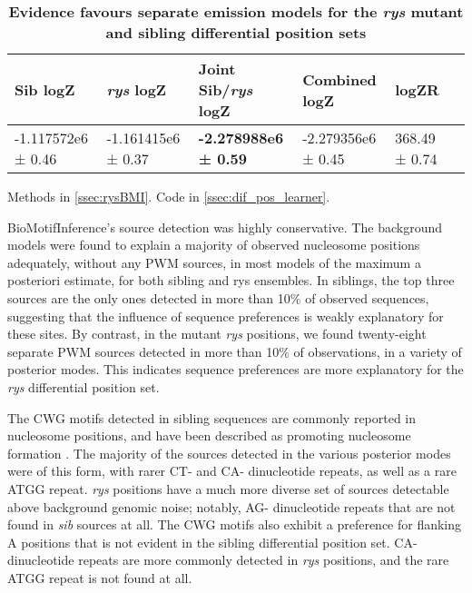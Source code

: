 \begin{table}[!ht]
    \centering
    \caption{{\bf Evidence favours separate emission models for the \textit{rys} mutant and sibling differential position sets}}
    \begin{tabular}{|l|l|l|l|l|l|}
        \hline {\bf Sib logZ} & {\bf \textit{rys} logZ} & {\bf Joint Sib/\textit{rys} logZ} & {\bf Combined logZ} & {\bf logZR} \\ \hline
        -1.117572e6 ± 0.46 & -1.161415e6 ± 0.37 & {\bf -2.278988e6 ± 0.59} & -2.279356e6 ± 0.45 &  368.49 ± 0.74 \\ \hline
        \end{tabular}
    \begin{flushleft}
        Methods in \autoref{ssec:rysBMI}.
        Code in \autoref{ssec:dif_pos_learner}.
    \end{flushleft}
    \label{BMIevidencetable}
\end{table}

BioMotifInference's source detection was highly conservative. The background models were found to explain a majority of observed nucleosome positions adequately, without any PWM sources, in most models of the maximum a posteriori estimate, for both sibling and rys ensembles. In siblings, the top three sources are the only ones detected in more than 10\% of observed sequences, suggesting that the influence of sequence preferences is weakly explanatory for these sites. By contrast, in the mutant \textit{rys} positions, we found twenty-eight separate PWM sources detected in more than 10\% of observations, in a variety of posterior modes. This indicates sequence preferences are more explanatory for the \textit{rys} differential position set.

The CWG motifs detected in sibling sequences are commonly reported in nucleosome positions, and have been described as promoting nucleosome formation \cite{Hasan2003}. The majority of the sources detected in the various posterior modes were of this form, with rarer CT- and CA- dinucleotide repeats, as well as a rare ATGG repeat. \textit{rys} positions have a much more diverse set of sources detectable above background genomic noise; notably, AG- dinucleotide repeats that are not found in \textit{sib} sources at all. The CWG motifs also exhibit a preference for flanking A positions that is not evident in the sibling differential position set. CA- dinucleotide repeats are more commonly detected in \textit{rys} positions, and the rare ATGG repeat is not found at all.

